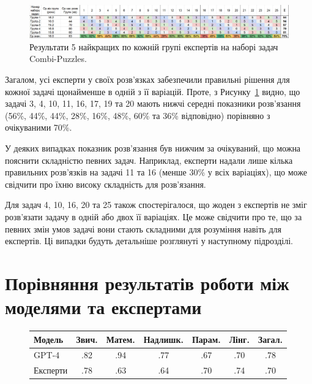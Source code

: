 \begin{figure}
    \centering
    \includegraphics[width=1\textwidth]{data/human_results_top5.pdf}
    \caption{Результати 5 найкращих по кожній групі експертів на наборі задач Combi-Puzzles.}
    \label{fig:human_results}
\end{figure}

Загалом, усі експерти у своїх розв’язках забезпечили правильні рішення для кожної задачі щонайменше в одній з її варіацій. Проте, з Рисунку~\ref{fig:human_results} видно, що задачі 3, 4, 10, 11, 16, 17, 19 та 20 мають нижчі середні показники розв’язання (56\%, 44\%, 44\%, 28\%, 16\%, 48\%, 60\% та 36\% відповідно) порівняно з очікуваними 70\%.

У деяких випадках показник розв’язання був нижчим за очікуваний, що можна пояснити складністю певних задач. Наприклад, експерти надали лише кілька правильних розв’язків на задачі 11 та 16 (менше 30\% у всіх варіаціях), що може свідчити про їхню високу складність для розв’язання.

Для задач 4, 10, 16, 20 та 25 також спостерігалося, що жоден з експертів не зміг розв’язати задачу в одній або двох її варіаціях. Це може свідчити про те, що за певних змін умов задачі вони стають складними для розуміння навіть для експертів. Ці випадки будуть детальніше розглянуті у наступному підрозділі.

\section{Порівняння результатів роботи між моделями та експертами}

\begin{figure}
\centering
    \begin{tabular}{|l|ccccc|c|}
        \hline
        Модель & Звич. & Матем. & Надлишк. & Парам. & Лінг. & Загал. \\
        \hline
        GPT-4 & .82 & .94 & .77 & .67 & .70 & .78 \\
        Експерти & .78 & .63 & .64 & .70 & .74 & .70 \\
        \hline
    \end{tabular}
    \label{tab:forms_human_v_model}
\end{figure}


